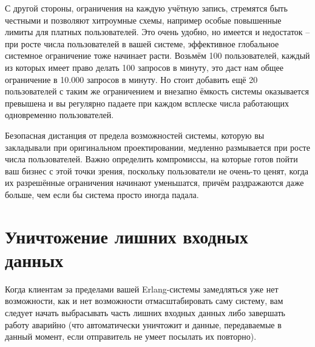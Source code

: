 \documentclass[11pt, oneside]{book}   	%
\begin{document}
С другой стороны, ограничения на каждую учётную запись, стремятся быть честными и позволяют хитроумные схемы, например особые повышенные лимиты для платных пользователей. Это очень удобно, но имеется и недостаток -- при росте числа пользователей в вашей системе, эффективное глобальное системное ограничение тоже начинает расти. Возьмём 100 пользователей, каждый из которых имеет право делать 100 запросов в минуту, это даст нам общее ограничение в 10.000 запросов в минуту. Но стоит добавить ещё 20 пользователей с таким же ограничением и внезапно ёмкость системы оказывается превышена и вы регулярно падаете при каждом всплеске числа работающих одновременно пользователей.

Безопасная дистанция от предела возможностей системы, которую вы закладывали при оригинальном проектировании, медленно размывается при росте числа пользователей. Важно определить компромиссы, на которые готов пойти ваш бизнес с этой точки зрения, поскольку пользователи не очень-то ценят, когда их разрешённые ограничения начинают уменьшатся, причём раздражаются даже больше, чем если бы система просто иногда падала.


\section{Уничтожение лишних входных данных}

Когда клиентам за пределами вашей Erlang-системы замедляться уже нет возможности, как и нет возможности отмасштабировать саму систему, вам следует начать выбрасывать часть лишних входных данных либо завершать работу аварийно (что автоматически уничтожит и данные, передаваемые в данный момент, если отправитель не умеет посылать их повторно).
\end{document}
